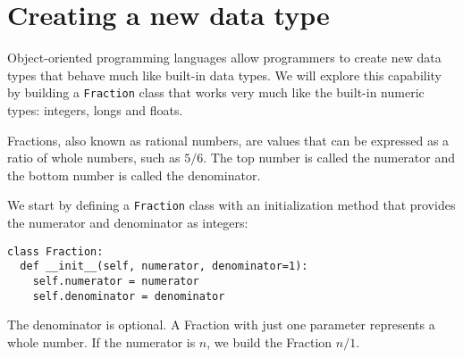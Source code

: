 

%

\chapter{Creating a new data type}
\label{overloading}

Object-oriented programming languages allow programmers to create new
data types that behave much like built-in data types.  We will explore
this capability by building a {\tt Fraction} class that works very much
like the built-in numeric types: integers, longs and floats.

Fractions, also known as rational numbers, are values that can be expressed
as a ratio of whole numbers, such as $5/6$. The top number is
called the numerator and the bottom number is called the denominator.


We start by defining a {\tt Fraction} class with an initialization
method that provides the numerator and denominator as integers:

\pagebreak

\beforeverb
\begin{verbatim}
class Fraction:
  def __init__(self, numerator, denominator=1):
    self.numerator = numerator
    self.denominator = denominator
\end{verbatim}
\afterverb
%
The denominator is optional.  A Fraction with just one
parameter represents a whole number.  If the numerator
is $n$, we build the Fraction
$n/1$.

